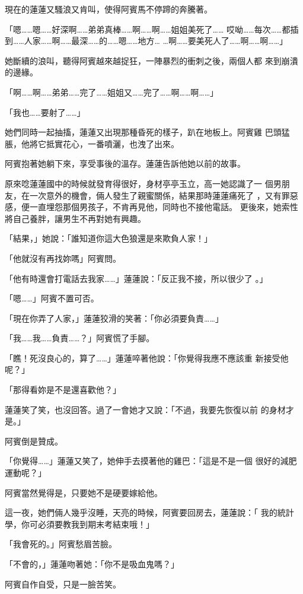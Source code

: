 現在的蓮蓮又騷浪又肯叫，使得阿賓馬不停蹄的奔騰著。

「嗯……嗯……好深啊……弟弟真棒……啊……啊……姐姐美死了……
哎呦……每次……都插到……人家……啊……最深……的……嗯……地方…
…啊……要美死人了……啊……啊……」

她斷續的浪叫，聽得阿賓越來越捉狂，一陣暴烈的衝刺之後，兩個人都
來到崩潰的邊緣。

「啊……啊……弟弟……完了……姐姐又……完了……啊……啊……」

「我也……要射了……」

她們同時一起抽搐，蓮蓮又出現那種昏死的樣子，趴在地板上。阿賓雞
巴頭猛脹，他將它抵實花心，一番噴灑，也洩了出來。

阿賓抱著她躺下來，享受事後的溫存。蓮蓮告訴他她以前的故事。

原來唸蓮蓮國中的時候就發育得很好，身材亭亭玉立，高一她認識了一
個男朋友，在一次意外的機會，倆人發生了親蜜關係，結果那時蓮蓮痛死了
，又有罪惡感，便一直埋怨那個男孩子，不肯再見他，同時也不接他電話。
更後來，她索性將自己養胖，讓男生不再對她有興趣。

「結果，」她說：「誰知道你這大色狼還是來欺負人家！」

「他就沒有再找妳嗎」阿賓問。

「他有時還會打電話去我家……」蓮蓮說：「反正我不接，所以很少了
。」

「嗯……」阿賓不置可否。

「現在你弄了人家，」蓮蓮狡滑的笑著：「你必須要負責……」

「我……我……負責……？」阿賓慌了手腳。

「瞧！死沒良心的，算了……」蓮蓮啐著他說：「你覺得我應不應該重
新接受他呢？」

「那得看妳是不是還喜歡他？」

蓮蓮笑了笑，也沒回答。過了一會她才又說：「不過，我要先恢復以前
的身材才是。」

阿賓倒是贊成。

「你覺得……」蓮蓮又笑了，她伸手去摸著他的雞巴：「這是不是一個
很好的減肥運動呢？」

阿賓當然覺得是，只要她不是硬要嫁給他。

這一夜，她們倆人幾乎沒睡，天亮的時候，阿賓要回房去，蓮蓮說：「
我的統計學，你可必須要教我到期末考結束哦！」

「我會死的。」阿賓愁眉苦臉。

「不會的，」蓮蓮吻著她：「你不是吸血鬼嗎？」

阿賓自作自受，只是一臉苦笑。










